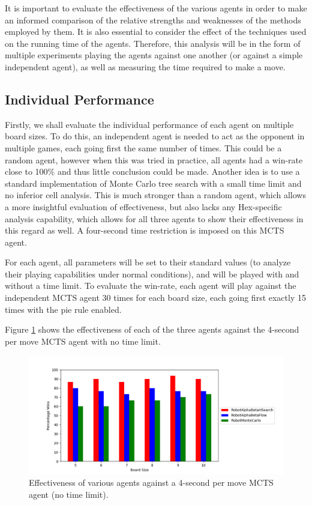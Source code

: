 
It is important to evaluate the effectiveness of the various agents in order to make an informed comparison of the relative strengths and weaknesses of the methods employed by them. It is also essential to consider the effect of the techniques used on the running time of the agents. Therefore, this analysis will be in the form of multiple experiments playing the agents against one another (or against a simple independent agent), as well as measuring the time required to make a move.

\subsection{Individual Performance}
Firstly, we shall evaluate the individual performance of each agent on multiple board sizes. To do this, an independent agent is needed to act as the opponent in multiple games, each going first the same number of times. This could be a random agent, however when this was tried in practice, all agents had a win-rate close to 100\% and thus little conclusion could be made. Another idea is to use a standard implementation of Monte Carlo tree search with a small time limit and no inferior cell analysis. This is much stronger than a random agent, which allows a more insightful evaluation of effectiveness, but also lacks any Hex-specific analysis capability, which allows for all three agents to show their effectiveness in this regard as well. A four-second time restriction is imposed on this MCTS agent.

For each agent, all parameters will be set to their standard values (to analyze their playing capabilities under normal conditions), and will be played with and without a time limit. To evaluate the win-rate, each agent will play against the independent MCTS agent 30 times for each board size, each going first exactly 15 times with the pie rule enabled.

Figure \ref{fig:comparison} shows the effectiveness of each of the three agents against the 4-second per move MCTS agent with no time limit. 



\begin{figure}
    \centering
    \includegraphics[scale = 0.6]{images/NEWCOMPARISON.png}
    \caption{Effectiveness of various agents against a 4-second per move MCTS agent (no time limit).}
    \label{fig:comparison}
\end{figure}

